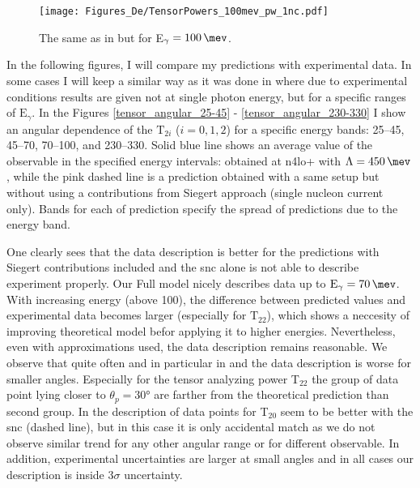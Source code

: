    \begin{figure}[h]
        \begin{center}
        \texttt{[image: Figures\_De/TensorPowers\_100mev\_pw\_1nc.pdf]}
        \end{center}
        \caption{The same as in  but for E$_\gamma=\SI{100}{\mev}$.}
        \label{tensor_pw_1nc_100mev}
    \end{figure}

    
    In the following figures, I will compare my predictions with experimental data.
    In some cases I will keep a similar way as it was done
    in \cite{rachek2007} where due to experimental conditions results are given not at single photon energy,
    but for a specific ranges of $\text{E}_\gamma$.
    In the Figures \ref{tensor_angular_25-45} - \ref{tensor_angular_230-330}
    I show an angular dependence of the $\text{T}_{2i}$ ($i=0,1,2$) for a specific energy bands:
    \SIrange[range-phrase=--]{25}{45}{\mev}, \SIrange[range-phrase=--]{45}{70}{\mev},
    \SIrange[range-phrase=--]{70}{100}{\mev}, and \SIrange[range-phrase=--]{230}{330}{\mev}.
    Solid blue line shows an average value of the observable in the specified energy intervals:
    obtained at \gls{n4lo+} with $\Lambda=\SI{450}{\mev}$, while the pink dashed line is a prediction
    obtained with a same setup but without using a contributions from Siegert approach
    (single nucleon current only). Bands for each of prediction specify the spread of
    predictions due to the energy band.
    

    One clearly sees that the data description is better for the predictions with Siegert contributions included
    and the \gls{snc} alone is not able to describe experiment properly.
    Our Full model nicely describes data up to $\text{E}_\gamma = \SI{70}{\mev}$.
    With increasing energy (above \SI{100}{\mev}),
    the difference between predicted values and experimental data becomes larger
    (especially for $\text{T}_{22}$), 
    which shows a neccesity of improving theoretical model befor applying it to 
    higher energies. Nevertheless, even with approximations used,
    the data description remains reasonable. 
    We observe that quite often and in particular in  and 
    the data description is worse for smaller angles. Especially for the tensor analyzing power T$_{22}$
    the group of data point lying closer to $\theta_p = \ang{30}$ are farther 
    from the theoretical prediction than second group.
    In  the description of data points for T$_{20}$ seem to be better
    with the \gls{snc} (dashed line), but in this case it is only accidental match as we do not observe similar 
    trend for any other angular range or for different observable. 
    In addition, experimental uncertainties are larger at small angles and in all cases 
    our description is inside 3$\sigma$ uncertainty.
    




